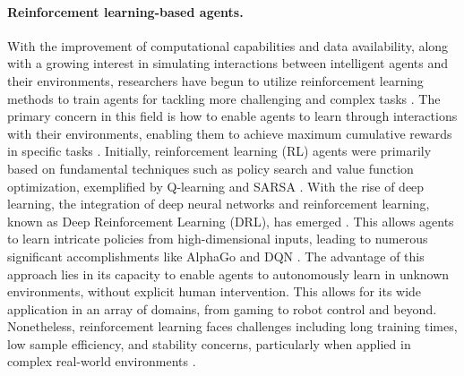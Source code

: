 \documentclass{article}
\begin{document}
\paragraph{Reinforcement learning-based agents.}

With the improvement of computational capabilities and data availability, along with a growing interest in simulating interactions between intelligent agents and their environments, researchers have begun to utilize reinforcement learning methods to train agents for tackling more challenging and complex tasks \cite{ribeiro2002reinforcement,kaelbling1996reinforcement,minsky1961steps,isbell2001social}.
The primary concern in this field is how to enable agents to learn through interactions with their environments, enabling them to achieve maximum cumulative rewards in specific tasks \cite{sutton2018reinforcement}. 
Initially, reinforcement learning (RL) agents were primarily based on fundamental techniques such as policy search and value function optimization, exemplified by Q-learning \cite{watkins1989learning} and SARSA \cite{rummery1994line}. 
With the rise of deep learning, the integration of deep neural networks and reinforcement learning, known as Deep Reinforcement Learning (DRL), has emerged \cite{tesauro1995temporal,li2017deep}. This allows agents to learn intricate policies from high-dimensional inputs, leading to numerous significant accomplishments like AlphaGo \cite{silver2016mastering} and DQN \cite{mnih2013playing}. 
The advantage of this approach lies in its capacity to enable agents to autonomously learn in unknown environments, without explicit human intervention. This allows for its wide application in an array of domains, from gaming to robot control and beyond. 
Nonetheless, reinforcement learning faces challenges including long training times, low sample efficiency, and stability concerns, particularly when applied in complex real-world environments \cite{sutton2018reinforcement}.
\end{document}

